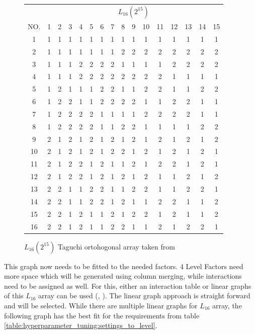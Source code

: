 \begin{figure}[H]
	\centering
\begin{tabular}{ |c||c|c|c|c|c|c|c|c|c|c|c|c|c|c|c|  }
	\hline
	   & \multicolumn{15}{|c|}{ $L_{16}(2^{15})$ } \\
	NO.& 1 & 2 & 3 & 4 & 5 & 6 & 7 & 8 & 9 & 10& 11& 12& 13& 14&15\\
	\hline
	1  & 1 & 1 & 1 & 1 & 1 & 1 & 1 & 1 & 1 & 1 & 1 & 1 & 1 & 1 & 1\\
	2  & 1 & 1 & 1 & 1 & 1 & 1 & 1 & 2 & 2 & 2 & 2 & 2 & 2 & 2 & 2\\
	3  & 1 & 1 & 1 & 2 & 2 & 2 & 2 & 1 & 1 & 1 & 1 & 2 & 2 & 2 & 2\\
	4  & 1 & 1 & 1 & 2 & 2 & 2 & 2 & 2 & 2 & 2 & 2 & 1 & 1 & 1 & 1\\
	5  & 1 & 2 & 1 & 1 & 1 & 2 & 2 & 1 & 1 & 2 & 2 & 1 & 1 & 2 & 2\\
	6  & 1 & 2 & 2 & 1 & 1 & 2 & 2 & 2 & 2 & 1 & 1 & 2 & 2 & 1 & 1\\
	7  & 1 & 2 & 2 & 2 & 2 & 1 & 1 & 1 & 1 & 2 & 2 & 2 & 2 & 1 & 1\\
	8  & 1 & 2 & 2 & 2 & 2 & 1 & 1 & 2 & 2 & 1 & 1 & 1 & 1 & 2 & 2\\
	9  & 2 & 1 & 2 & 1 & 2 & 1 & 2 & 1 & 2 & 1 & 2 & 1 & 2 & 1 & 2\\
	10 & 2 & 1 & 2 & 1 & 2 & 1 & 2 & 2 & 1 & 2 & 1 & 2 & 1 & 2 & 1\\
	11 & 2 & 1 & 2 & 2 & 1 & 2 & 1 & 1 & 2 & 1 & 2 & 2 & 1 & 2 & 1\\
	12 & 2 & 1 & 2 & 2 & 1 & 2 & 1 & 2 & 1 & 2 & 1 & 1 & 2 & 1 & 2\\
	13 & 2 & 2 & 1 & 1 & 2 & 2 & 1 & 1 & 2 & 2 & 1 & 1 & 2 & 2 & 1\\
	14 & 2 & 2 & 1 & 1 & 2 & 2 & 1 & 2 & 1 & 1 & 2 & 2 & 1 & 1 & 2\\
	15 & 2 & 2 & 1 & 2 & 1 & 1 & 2 & 1 & 2 & 2 & 1 & 2 & 1 & 1 & 2\\
	16 & 2 & 2 & 1 & 2 & 1 & 1 & 2 & 2 & 1 & 1 & 2 & 1 & 2 & 2 & 1\\
	\hline
\end{tabular}
\label{table:hyperparameter_tuning:L16_orhtogonal_array}
\caption{ $L_{16}(2^{15})$ Taguchi ortohogonal array taken from \cite{roy_primer_1990}}
\end{figure}


This graph now needs to be fitted to the needed factors. 4 Level Factors need more space which will be generated using column merging, while interactions need to be assigned as well.
For this, either an interaction table or linear graphs of this $L_{16}$ array can be used (\cite{roy_primer_1990}, \cite{nazandanacioglu_taguchi_2005}). 
The linear graph approach is straight forward and will be selected. While there are multiple linear graphs for $L_{16}$ array, the following graph has the best fit for the requirements from table \ref{table:hyperparameter_tuning:settings_to_level}.


